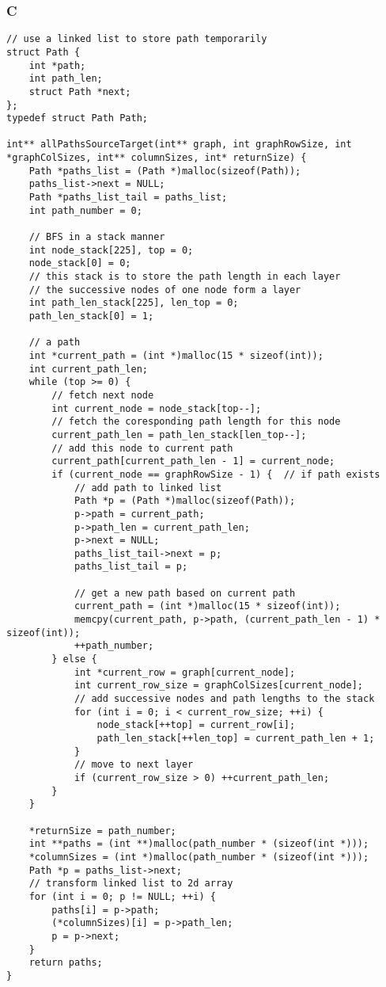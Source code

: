 \subsubsection{C}
\begin{verbatim}
// use a linked list to store path temporarily
struct Path {
    int *path;
    int path_len;
    struct Path *next;
};
typedef struct Path Path;

int** allPathsSourceTarget(int** graph, int graphRowSize, int *graphColSizes, int** columnSizes, int* returnSize) {
    Path *paths_list = (Path *)malloc(sizeof(Path));
    paths_list->next = NULL;
    Path *paths_list_tail = paths_list;
    int path_number = 0;
    
    // BFS in a stack manner
    int node_stack[225], top = 0;
    node_stack[0] = 0;
    // this stack is to store the path length in each layer
    // the successive nodes of one node form a layer
    int path_len_stack[225], len_top = 0;
    path_len_stack[0] = 1;
    
    // a path
    int *current_path = (int *)malloc(15 * sizeof(int));
    int current_path_len;
    while (top >= 0) {
        // fetch next node
        int current_node = node_stack[top--];
        // fetch the coresponding path length for this node
        current_path_len = path_len_stack[len_top--];
        // add this node to current path
        current_path[current_path_len - 1] = current_node;
        if (current_node == graphRowSize - 1) {  // if path exists
            // add path to linked list
            Path *p = (Path *)malloc(sizeof(Path));
            p->path = current_path;
            p->path_len = current_path_len;
            p->next = NULL;
            paths_list_tail->next = p;
            paths_list_tail = p;
            
            // get a new path based on current path
            current_path = (int *)malloc(15 * sizeof(int));
            memcpy(current_path, p->path, (current_path_len - 1) * sizeof(int));
            ++path_number;
        } else {
            int *current_row = graph[current_node];
            int current_row_size = graphColSizes[current_node];
            // add successive nodes and path lengths to the stack
            for (int i = 0; i < current_row_size; ++i) {
                node_stack[++top] = current_row[i];
                path_len_stack[++len_top] = current_path_len + 1;
            }
            // move to next layer
            if (current_row_size > 0) ++current_path_len;
        }
    }
    
    *returnSize = path_number;
    int **paths = (int **)malloc(path_number * (sizeof(int *)));
    *columnSizes = (int *)malloc(path_number * (sizeof(int *)));
    Path *p = paths_list->next;
    // transform linked list to 2d array
    for (int i = 0; p != NULL; ++i) {
        paths[i] = p->path;
        (*columnSizes)[i] = p->path_len;
        p = p->next;
    }
    return paths;
}

\end{verbatim}

\newpage

